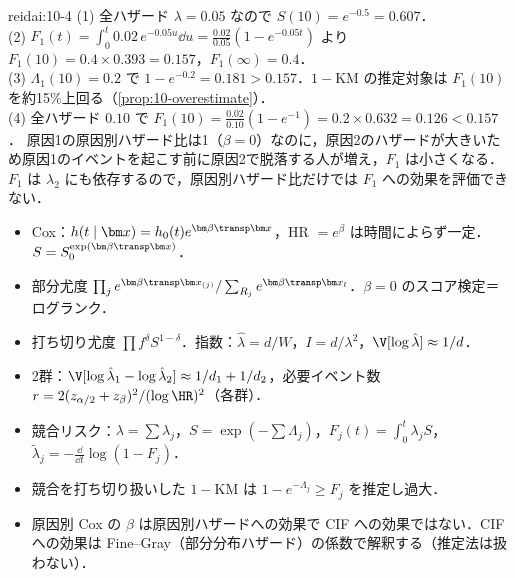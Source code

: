 \begin{kaitou}{reidai:10-4}
(1) 全ハザード $\lambda=0.05$ なので $S(10)=e^{-0.5}=0.607$．\\
(2) $F_1(t)=\int_0^t0.02\,e^{-0.05u}\dd u=\frac{0.02}{0.05}(1-e^{-0.05t})$ より $F_1(10)=0.4\times0.393=0.157$，$F_1(\infty)=0.4$．\\
(3) $\Lambda_1(10)=0.2$ で $1-e^{-0.2}=0.181>0.157$．$1-\mathrm{KM}$ の推定対象は $F_1(10)$ を約15\%上回る（\cref{prop:10-overestimate}）．\\
(4) 全ハザード $0.10$ で $F_1(10)=\frac{0.02}{0.10}(1-e^{-1})=0.2\times0.632=0.126<0.157$．
原因1の原因別ハザード比は1（$\beta=0$）なのに，原因2のハザードが大きいため原因1のイベントを起こす前に原因2で脱落する人が増え，$F_1$ は小さくなる．
$F_1$ は $\lambda_2$ にも依存するので，原因別ハザード比だけでは $F_1$ への効果を評価できない．
\end{kaitou}

\begin{summarybox}
\begin{itemize}
\item Cox：$h(t\mid\bm x)=h_0(t)e^{\bm\beta\transp\bm x}$，HR $=e^\beta$ は時間によらず一定．$S=S_0^{\exp(\bm\beta\transp\bm x)}$．
\item 部分尤度 $\prod_j e^{\bm\beta\transp\bm x_{(j)}}/\sum_{R_j}e^{\bm\beta\transp\bm x_l}$．$\beta=0$ のスコア検定＝ログランク．
\item 打ち切り尤度 $\prod f^{\delta}S^{1-\delta}$．指数：$\hat\lambda=d/W$，$I=d/\lambda^2$，$\V[\log\hat\lambda]\approx1/d$．
\item 2群：$\V[\log\hat\lambda_1-\log\hat\lambda_2]\approx1/d_1+1/d_2$，必要イベント数 $r=2(z_{\alpha/2}+z_\beta)^2/(\log\HR)^2$（各群）．
\item 競合リスク：$\lambda=\sum\lambda_j$，$S=\exp(-\sum\Lambda_j)$，$F_j(t)=\int_0^t\lambda_jS$，$\tilde\lambda_j=-\frac{\dd}{\dd t}\log(1-F_j)$．
\item 競合を打ち切り扱いした $1-\mathrm{KM}$ は $1-e^{-\Lambda_j}\ge F_j$ を推定し過大．
\item 原因別 Cox の $\beta$ は原因別ハザードへの効果で CIF への効果ではない．CIF への効果は Fine--Gray（部分分布ハザード）の係数で解釈する（推定法は扱わない）．
\end{itemize}
\end{summarybox}
